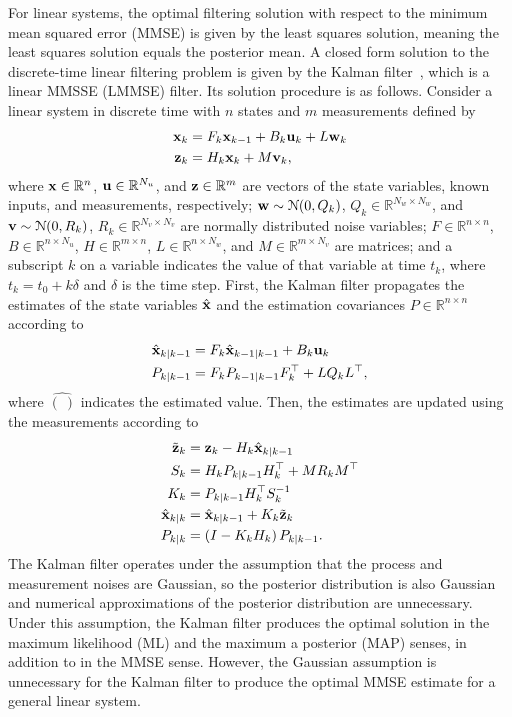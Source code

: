 \documentclass[../zhang_thesis.tex]{subfiles}
\begin{document}
For linear systems, the optimal filtering solution with respect to the minimum mean squared error (MMSE) is given by the least squares solution, meaning the least squares solution equals the posterior mean. A closed form solution to the discrete-time linear filtering problem is given by the Kalman filter~\cite{kalman60}, which is a linear MMSSE (LMMSE) filter. Its solution procedure is as follows. Consider a linear system in discrete time with $n$ states and $m$ measurements defined by
\begin{align}
    \mathbf{x}_k &= F_k \mathbf{x}_{k-1} + B_k \mathbf{u}_k + L \mathbf{w}_k \\
    \mathbf{z}_k &= H_k \mathbf{x}_k + M \mathbf{v}_k,
\end{align}
where $\mathbf{x}\in\mathbb{R}^n$, $\mathbf{u}\in\mathbb{R}^{N_u}$, and $\mathbf{z}\in\mathbb{R}^m$ are vectors of the state variables, known inputs, and measurements, respectively; $\mathbf{w}\sim\mathcal{N}(0,Q_k)$, $Q_k\in\mathbb{R}^{N_w\times N_w}$, and $\mathbf{v}\sim\mathcal{N}(0,R_k)$, $R_k\in\mathbb{R}^{N_v\times N_v}$ are normally distributed noise variables; $F\in\mathbb{R}^{n\times n}$, $B\in\mathbb{R}^{n\times N_u}$, $H\in\mathbb{R}^{m\times n}$, $L\in\mathbb{R}^{n\times N_w}$, and $M\in\mathbb{R}^{m\times N_v}$ are matrices; and a subscript $k$ on a
variable indicates the value of that variable at time $t_k$, where $t_k=t_0+k\delta$ and $\delta$ is the time step. First, the Kalman filter propagates the estimates of the state variables $\hat{\mathbf{x}}$ and the estimation covariances $P\in\mathbb{R}^{n\times n}$ according to
\begin{align}
    \hat{\mathbf{x}}_{k|k-1} &= F_k \hat{\mathbf{x}}_{k-1|k-1} + B_k \mathbf{u}_k \label{eq:kfp1} \\
    P_{k|k-1} &= F_k P_{k-1|k-1} F_k^\top + L Q_k L^\top, \label{eq:kfp2}
\end{align}
where $\hat{(\ )}$ indicates the estimated value. Then, the estimates are updated using the measurements according to
\begin{align}
    \tilde{\mathbf{z}}_k &= \mathbf{z}_k - H_k \hat{\mathbf{x}}_{k|k-1} \label{eq:kfu1} \\
    S_k &= H_k P_{k|k-1} H_k^\top + M R_k M^\top \\
    K_k &= P_{k|k-1} H_k^\top S_k^{-1} \\
    \hat{\mathbf{x}}_{k|k} &= \hat{\mathbf{x}}_{k|k-1} + K_k \tilde{\mathbf{z}}_k \\
    P_{k|k} &= \left( I - K_k H_k \right) P_{k|k-1}. \label{eq:kful} 
\end{align}
The Kalman filter operates under the assumption that the process and measurement noises are Gaussian, so the posterior distribution is also Gaussian and numerical approximations of the posterior distribution are unnecessary. Under this assumption, the Kalman filter produces the optimal solution in the maximum likelihood (ML) and the maximum a posterior (MAP) senses, in addition to in the MMSE sense. However, the Gaussian assumption is unnecessary for the Kalman filter to produce the
optimal MMSE estimate for a general linear system.
\end{document}
